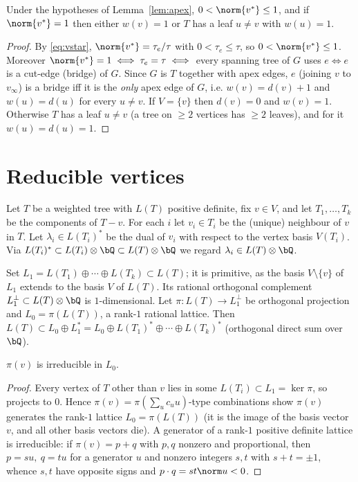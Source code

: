 \begin{cor}
\label{cor:tight}
Under the hypotheses of Lemma~\ref{lem:apex}, $0<\norm{v^\ast}\le1$, and if $\norm{v^\ast}=1$
then either $w(v)=1$ or $T$ has a leaf $u\ne v$ with $w(u)=1$.
\end{cor}

\begin{proof}
By \eqref{eq:vstar}, $\norm{v^\ast}=\tau_e/\tau$ with $0<\tau_e\le\tau$, so
$0<\norm{v^\ast}\le1$.  Moreover $\norm{v^\ast}=1\iff\tau_e=\tau\iff$ every spanning tree of
$G$ uses $e\iff e$ is a cut-edge (bridge) of $G$.  Since $G$ is $T$ together with apex edges,
$e$ (joining $v$ to $v_\infty$) is a bridge iff it is the \emph{only} apex edge of $G$, i.e.
$w(v)=d(v)+1$ and $w(u)=d(u)$ for every $u\ne v$.  If $V=\{v\}$ then $d(v)=0$ and
$w(v)=1$.  Otherwise $T$ has a leaf $u\ne v$ (a tree on $\ge2$ vertices has $\ge2$ leaves),
and for it $w(u)=d(u)=1$.
\end{proof}

\section{Reducible vertices}
\label{sec:reducible}

Let $T$ be a weighted tree with $L(T)$ positive definite, fix $v\in V$, and let
$T_1,\dots,T_k$ be the components of $T-v$.  For each $i$ let $v_i\in T_i$ be the (unique)
neighbour of $v$ in $T$.  Let $\lambda_i\in L(T_i)^\ast$ be the dual of $v_i$ with respect to
the vertex basis $V(T_i)$.  Via $L(T_i)^\ast\subset L(T_i)\otimes\bQ\subset L(T)\otimes\bQ$
we regard $\lambda_i\in L(T)\otimes\bQ$.

Set $L_1=L(T_1)\oplus\cdots\oplus L(T_k)\subset L(T)$; it is primitive, as the basis
$V\setminus\{v\}$ of $L_1$ extends to the basis $V$ of $L(T)$.  Its rational orthogonal
complement $L_1^\perp\subset L(T)\otimes\bQ$ is $1$-dimensional.  Let
$\pi:L(T)\to L_1^\perp$ be orthogonal projection and $L_0=\pi(L(T))$, a rank-$1$ rational
lattice.  Then $L(T)\subset L_0\oplus L_1^\ast=L_0\oplus L(T_1)^\ast\oplus\cdots\oplus
L(T_k)^\ast$ (orthogonal direct sum over $\bQ$).

\begin{lem}
\label{lem:irred}
$\pi(v)$ is irreducible in $L_0$.
\end{lem}

\begin{proof}
Every vertex of $T$ other than $v$ lies in some $L(T_i)\subset L_1=\ker\pi$, so projects to
$0$.  Hence $\pi(v)=\pi(\sum_{u}c_uu)$-type combinations show $\pi(v)$ generates the rank-$1$
lattice $L_0=\pi(L(T))$ (it is the image of the basis vector $v$, and all other basis vectors
die).  A generator of a rank-$1$ positive definite lattice is irreducible: if
$\pi(v)=p+q$ with $p,q$ nonzero and proportional, then $p=su,\ q=tu$ for a generator $u$ and
nonzero integers $s,t$ with $s+t=\pm1$, whence $s,t$ have opposite signs and
$p\cdot q=st\norm u<0$.
\end{proof}

